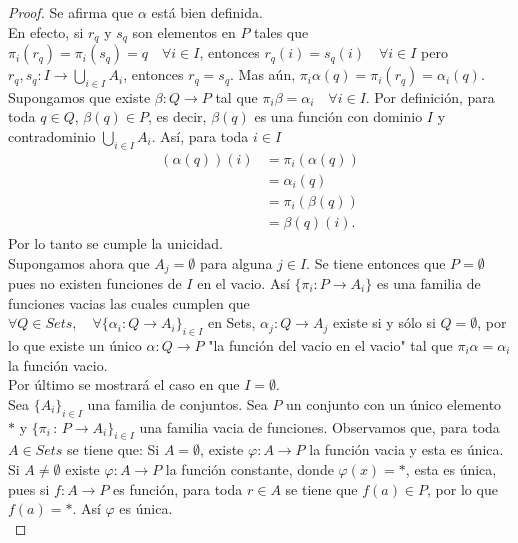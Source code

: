 \documentclass{article}
\begin{document}
\begin{enumerate}[label=\textbf{Ej \arabic*.}]
\begin{proof}
Se afirma que $\alpha$ está bien definida.\\
En efecto, si $r_q$ y $s_q$ son elementos en $P$ tales que \\$\pi_i(r_q)=\pi_i(s_q)=q\quad \forall i\in I$, entonces $r_q(i)=s_q(i)\quad \forall i\in I$
pero \\$r_q,s_q:I\to \displaystyle\bigcup_{i\in I}A_i$, entonces $r_q=s_q$. Mas aún, $\pi_i\alpha(q)=\pi_i(r_q)=\alpha_i(q).$\\

Supongamos que existe $\beta:Q\to P$ tal que $\pi_i\beta=\alpha_i\quad \forall i\in I$. Por definición, para toda $q\in Q$, $\beta(q)\in P$, 
es decir, $\beta(q)$ es una función con dominio $I$ y contradominio $ \displaystyle\bigcup_{i\in I}A_i$. Así, para toda $i\in I$
\begin{align*}
(\alpha(q))(i)&=\pi_i(\alpha(q))\\
&=\alpha_i(q)\\
&=\pi_i(\beta(q))\\
&=\beta(q)(i).
\end{align*}
Por lo tanto se cumple la unicidad.\\

Supongamos ahora que $A_j=\emptyset$ para alguna $j\in I$. Se tiene entonces que $P=\emptyset$ pues no existen funciones de $I$ en el vacio.
Así $\{\pi_i:P\to A_i\}$ es una familia de funciones vacias las cuales cumplen que \\$\forall Q\in Sets,\quad \forall \{\alpha_i:Q\to A_i\}_{i\in I}$ en 
Sets, $\alpha_j:Q\to A_j$ existe si y sólo si $Q=\emptyset$, por lo que existe un único $\alpha:Q\to P$ "la función del vacio en el vacio" tal que 
$\pi_i\alpha=\alpha_i$ la función vacio.\\

Por último se mostrará el caso en que $I=\emptyset$.\\

Sea $\{A_i\}_{i\in I}$ una familia de conjuntos. Sea $P$ un conjunto con un único elemento $*$ y $\{\pi_i\,:\,P\to A_i\}_{i\in I}$ una familia vacia 
de funciones. Observamos que, para toda $A\in Sets$ se tiene que: Si $A=\emptyset$, existe $\varphi:A\to P$ la 
función vacia y esta es única.\\
Si $A\neq \emptyset$ existe $\varphi:A\to P$ la función constante, donde $\varphi(x)=*$, esta es única, pues si $f:A\to P$ es función, para toda $r\in A$
se tiene que  $f(a)\in P$, por lo que $f(a)=*$. Así $\varphi$ es única.\\


\end{proof}
\end{enumerate}
\end{document}
